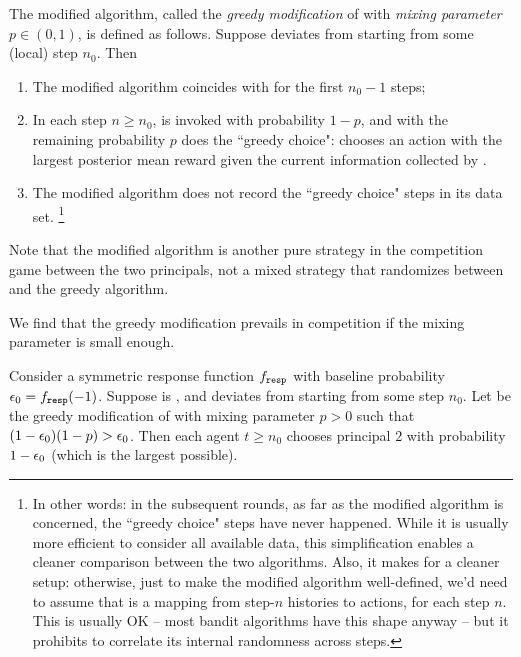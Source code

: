 The modified algorithm, called the \emph{greedy modification} of \alg  with \emph{mixing parameter} $p\in (0,1)$, is defined as follows. Suppose \alg deviates from \DynGreedy starting from some (local) step $n_0$. Then
\begin{enumerate}
\item The modified algorithm coincides with \DynGreedy
for the first $n_0-1$ steps;
\item In each step $n\geq n_0$, \alg is invoked with probability
  $1-p$, and with the remaining probability $p$ does the ``greedy
  choice": chooses an action with the largest posterior mean reward
  given the current information collected by \alg.

\item The modified algorithm does not record the ``greedy choice" steps in its data set.%
    \footnote{In other words: in the subsequent rounds, as far as the modified algorithm is concerned, the ``greedy choice" steps have never happened. While it is usually more efficient to consider all available data, this simplification enables a cleaner comparison between the two algorithms. Also, it makes for  a cleaner setup: otherwise, just to make the modified algorithm well-defined, we'd need to assume that \alg[1] is a mapping from step-$n$ histories to actions, for each step $n$. This is usually OK -- most bandit algorithms have this shape anyway -- but it prohibits \alg[1] to correlate its internal randomness across steps.}

\end{enumerate}

\noindent Note that the modified algorithm is another pure strategy in the competition game between the two principals, not a mixed strategy that randomizes between \alg and the greedy algorithm.

We find that the greedy modification prevails in competition if the mixing parameter is small enough.

\begin{theorem}\label{thm:random-greedy}
Consider a symmetric \HardMaxRandom response function $f_{\mathtt{resp}}$ with baseline probability $\epsilon_0 = f_{\mathtt{resp}}(-1)$. Suppose \alg[1] is \bmonotone, and deviates from \DynGreedy starting from some step $n_0$. Let \alg[2] be the greedy modification of \alg[1] with mixing parameter $p>0$ such that
    $(1-\epsilon_0)(1-p)>\epsilon_0$.
Then each agent $t\geq n_0$ chooses principal $2$ with probability $1-\epsilon_0$ (which is the largest possible).
\end{theorem}

